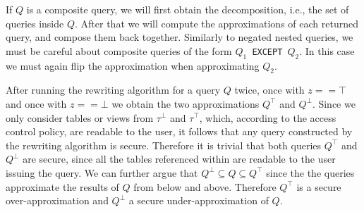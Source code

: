 If $Q$ is a composite query, we will first obtain the decomposition, i.e., the set of queries inside $Q$. 
%
After that we will compute the approximations of each returned query, and compose them back together.
%
Similarly to negated nested queries, we must be careful about composite queries of the form \texttt{$Q_1$ EXCEPT $Q_2$}.
%
In this case we must again flip the approximation when approximating $Q_2$.

After running the rewriting algorithm for a query $Q$ twice, once with $z == \top$ and once with $z == \bot$ we obtain the two approximations $Q^\top$ and $Q^\bot$.
%
Since we only consider tables or views from $\tau^\bot$ and $\tau^\top$, which, according to the access control policy, are readable to the user, it follows that any query constructed by the rewriting algorithm is secure.
%
Therefore it is trivial that both queries $Q^\top$ and $Q^\bot$ are secure, since all the tables referenced within are readable to the user issuing the query.
%
We can further argue that $Q^\bot \subseteq Q \subseteq Q^\top$ since the the queries approximate the results of $Q$ from below and above. 
%
Therefore $Q^\top$ is a secure over-approximation and $Q^\bot$ a secure under-approximation of $Q$.

